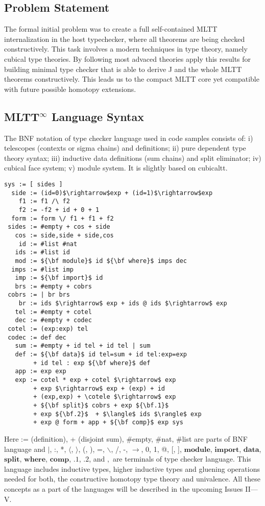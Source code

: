 \documentclass{article}
\theoremstyle{definition}
\begin{document}
\subsection*{Problem Statement}

The formal initial problem was to create a full self-contained MLTT internalization in the host typechecker,
where all theorems are being checked constructively. This task involves a modern techniques in type theory,
namely cubical type theories. By following most advaced theories apply this results for building minimal
type checker that is able to derive J and the whole MLTT theorems constructively. This leads us to the
compact MLTT core yet compatible with future possible homotopy extensions.

\subsection*{MLTT$^\infty$ Language Syntax}

The BNF notation of type checker language used in code samples consists of:
i) telescopes (contexts or sigma chains) and definitions;
ii) pure dependent type theory syntax;
iii) inductive data definitions (sum chains) and split eliminator;
iv) cubical face system;
v) module system. It is slightly based on cubicaltt.

\begin{lstlisting}[mathescape=true]
   sys := [ sides ]
  side := (id=0)$\rightarrow$exp + (id=1)$\rightarrow$exp
    f1 := f1 /\ f2
    f2 := -f2 + id + 0 + 1
  form := form \/ f1 + f1 + f2
 sides := #empty + cos + side
   cos := side,side + side,cos
    id := #list #nat
   ids := #list id
   mod := ${\bf module}$ id ${\bf where}$ imps dec
  imps := #list imp
   imp := ${\bf import}$ id
   brs := #empty + cobrs
 cobrs := | br brs
    br := ids $\rightarrow$ exp + ids @ ids $\rightarrow$ exp
   tel := #empty + cotel
   dec := #empty + codec
 cotel := (exp:exp) tel
 codec := def dec
   sum := #empty + id tel + id tel | sum
   def := ${\bf data}$ id tel=sum + id tel:exp=exp
        + id tel : exp ${\bf where}$ def
   app := exp exp
   exp := cotel * exp + cotel $\rightarrow$ exp
        + exp $\rightarrow$ exp + (exp) + id
        + (exp,exp) + \cotele $\rightarrow$ exp
        + ${\bf split}$ cobrs + exp ${\bf.1}$
        + exp ${\bf.2}$  + $\langle$ ids $\rangle$ exp
        + exp @ form + app + ${\bf comp}$ exp sys
\end{lstlisting}

Here := (definition), + (disjoint sum), \#empty, \#nat, \#list are parts of BNF language and
$\rvert$, :, *, $\langle$, $\rangle$, (, ), =, $\backslash$, /, -, $\rightarrow$, 0, 1, @, [, ],
$\mathbf{module}$, $\mathbf{import}$,
$\mathbf{data}$, $\mathbf{split}$, $\mathbf{where}$, $\mathbf{comp}$, $\mathbf{.1}$, $\mathbf{.2}$,
 and $,$ are terminals of type checker language. This language includes
inductive types, higher inductive types and gluening operations needed for
both, the constructive homotopy type theory and univalence. All these concepts as a part of the languages
will be described in the upcoming Issues II---V.
\end{document}
